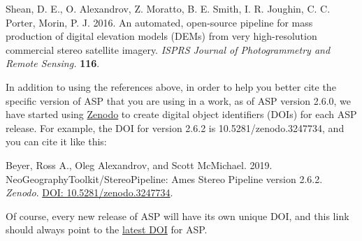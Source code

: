 \begin{description}
\item Shean, D. E., O. Alexandrov, Z. Moratto, B. E. Smith, I. R. Joughin, C. C. Porter, Morin, P. J. 2016.  An automated, open-source pipeline for mass production of digital elevation models (DEMs) from very high-resolution commercial stereo satellite imagery. 
\textit{ISPRS Journal of Photogrammetry and Remote Sensing.} 
\textbf{116}.
\end{description}

% 
% 

In addition to using the references above, in order to help you
better cite the specific version of ASP that you are using in a work, as of ASP version 2.6.0,
we have started using \href{https://zenodo.org}{Zenodo} to create digital object identifiers (DOIs)
for each ASP release.  For example, the DOI for version 2.6.2 is 10.5281/zenodo.3247734, and you can
cite it like this:

\begin{description}
\item Beyer, Ross A., Oleg Alexandrov, and Scott McMichael. 2019. NeoGeographyToolkit/StereoPipeline: Ames Stereo Pipeline version 2.6.2. \textit{Zenodo}. \href{https://doi.org/10.5281/zenodo.3247734}{DOI: 10.5281/zenodo.3247734}.
\end{description}

Of course, every new release of ASP will have its own unique DOI,
and this link should always point to the
\href{https://zenodo.org/badge/latestdoi/714891}{latest DOI} for
ASP.


